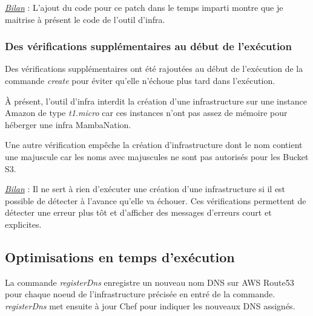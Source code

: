 \underline{\textit{Bilan}} : L'ajout du code pour ce patch dans le temps imparti
montre que je maitrise à présent le code de l'outil d'infra.



\subsubsection{Des vérifications supplémentaires au début de l'exécution}

Des vérifications supplémentaires ont été rajoutées au début de l'exécution de
la commande \textit{create} pour éviter qu'elle n'échoue plus tard dans
l'exécution.

À présent, l'outil d'infra interdit la création d'une infrastructure sur une
instance Amazon de type \textit{t1.micro} car ces instances n'ont pas assez de
mémoire pour héberger une infra MambaNation.

Une autre vérification empêche la création d'infrastructure dont le nom contient
une majuscule car les noms avec majuscules ne sont pas autorisés pour les Bucket
S3.

\underline{\textit{Bilan}} :  Il ne sert à rien d'exécuter une création d'une
infrastructure si il est possible de détecter à l'avance qu'elle va échouer.  
Ces vérifications permettent de détecter une erreur plus tôt et d'afficher des
messages d'erreurs court et explicites.





\subsection{Optimisations en temps d'exécution}

La commande \textit{registerDns} enregistre un nouveau nom DNS sur AWS Route53
pour chaque noeud de l'infrastructure précisée en entré de la
commande. \textit{registerDns} met ensuite à jour Chef pour indiquer les
nouveaux DNS assignés.

